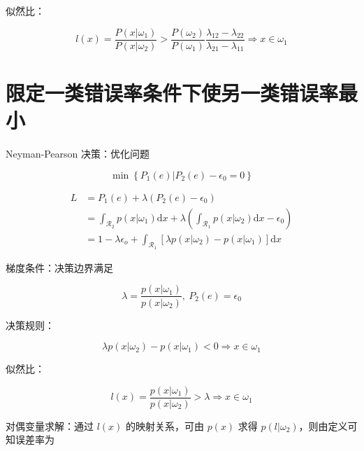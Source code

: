 \documentclass[openany,a4paper,12pt]{ctexbook}
\theoremstyle{kaiti}
\theoremstyle{normal}
\begin{document}
似然比：

\begin{equation}
l(x)=\frac{P\left(x|\omega_1 \right)}{P\left(x|\omega_2 \right)}>\frac{P\left(\omega_2 \right)}{P\left(\omega_1 \right)}\frac{\lambda_{12}-\lambda_{22}}{\lambda_{21}-\lambda_{11}}\Rightarrow x\in \omega_1
\end{equation}

\section{限定一类错误率条件下使另一类错误率最小}

Neyman-Pearson 决策：优化问题

\begin{equation}
\min \left\{ P_1\left(e \right)|P_2\left(e \right)-\epsilon_0=0 \right\}
\end{equation}

\begin{equation}
\begin{aligned}
  L
  &=P_1\left(e \right)+\lambda \left(P_2\left(e \right)-\epsilon_0 \right)\\
  &=\int_{\mathcal{R}_2}{p\left(x|\omega_1 \right)}\mathrm{d}x+\lambda \left(\int_{\mathcal{R}_1}{p\left(x|\omega_2 \right)}\mathrm{d}x-\epsilon_0 \right)\\
  &=1-\lambda \epsilon_o+\int_{\mathcal{R}_1}{\left[\lambda p\left(x|\omega_2 \right)-p\left(x|\omega_1 \right)\right]}\mathrm{d}x
\end{aligned}
\end{equation}

梯度条件：决策边界满足

\begin{equation}
\lambda =\frac{p\left(x|\omega_1 \right)}{p\left(x|\omega_2 \right)},~P_2\left(e \right)=\epsilon_0
\end{equation}

决策规则：

\begin{equation}
\lambda p\left(x|\omega_2 \right)-p\left(x|\omega_1 \right)<0\Rightarrow x\in \omega_1
\end{equation}

似然比：

\begin{equation}
l(x)=\frac{p\left(x|\omega_1 \right)}{p\left(x|\omega_2 \right)}>\lambda \Rightarrow x\in \omega_1
\end{equation}

对偶变量求解：通过 $l(x)$ 的映射关系，可由 $p(x)$ 求得 $p\left(l|\omega_2 \right)$，则由定义可知误差率为
\end{document}
